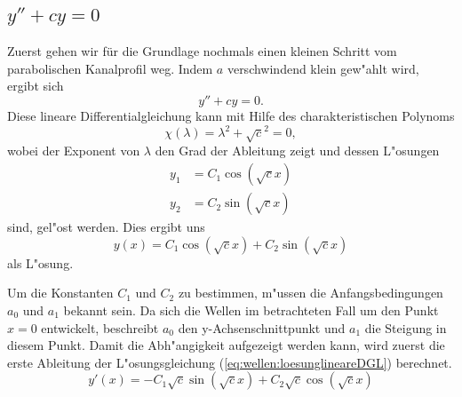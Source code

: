 \subsection{\texorpdfstring{$y''+cy = 0$}{y''+cy = 0}}
Zuerst gehen wir für die Grundlage nochmals einen kleinen Schritt vom 
parabolischen Kanalprofil weg. Indem $a$ verschwindend klein gew"ahlt wird, 
ergibt sich
\begin{equation}
	y''+ cy = 0.
	\label{eq:wellen:lineareDGL}
\end{equation}
Diese lineare Differentialgleichung kann mit Hilfe des charakteristischen 
Polynoms
\begin{equation*}
	\chi(\lambda) = \lambda^2+\sqrt{c}^2 = 0,
\end{equation*}
wobei der Exponent von $\lambda$ den Grad der Ableitung zeigt und dessen 
L"osungen
\begin{equation*}
	\begin{split}
		y_1 &= C_1\cos(\sqrt{c} x) \\
		y_2 &= C_2\sin(\sqrt{c} x)
	\end{split}
\end{equation*}
sind, gel"ost werden. Dies ergibt uns
\begin{equation}
	y(x) = C_1 \cos(\sqrt{c}x) + C_2 \sin(\sqrt{c}x)
	\label{eq:wellen:loesunglineareDGL}
\end{equation}
als L"osung.

Um die Konstanten $C_1$ und $C_2$ zu bestimmen, m"ussen die Anfangsbedingungen 
$a_0$ und $a_1$ bekannt sein. Da sich die Wellen im betrachteten Fall um den 
Punkt $x=0$ entwickelt, beschreibt $a_0$ den y-Achsenschnittpunkt und $a_1$ die 
Steigung in diesem Punkt. Damit die Abh"angigkeit aufgezeigt werden kann, wird 
zuerst die erste Ableitung der L"osungsgleichung 
(\ref{eq:wellen:loesunglineareDGL}) berechnet.
\begin{equation*}
	y'(x)=-C_1 \sqrt{c} \sin(\sqrt{c}x) + C_2 \sqrt{c} \cos(\sqrt{c}x)
\end{equation*}

